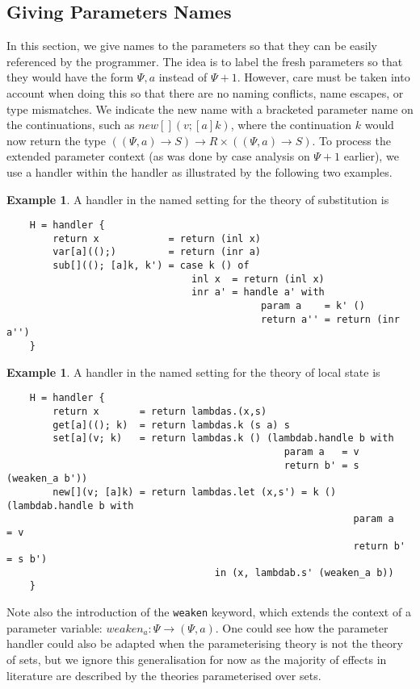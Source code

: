 \documentclass{scrartcl}
\theoremstyle{definition}
\newtheorem{example}[theorem]{Example}
\newcommand{\PCtx}{\Psi}
\begin{document}
\subsection{Giving Parameters Names}

In this section, we give names to the parameters so that they can be easily referenced by the programmer. The idea is to label the fresh parameters so that they would have the form $\PCtx,a$ instead of $\PCtx+1$. However, care must be taken into account when doing this so that there are no naming conflicts, name escapes, or type mismatches. We indicate the new name with a bracketed parameter name on the continuations, such as $new[](v; [a]k)$, where the continuation $k$ would now return the type $((\PCtx,a)\to S)\to R\times ((\PCtx,a)\to S)$. To process the extended parameter context (as was done by case analysis on $\PCtx+1$ earlier), we use a handler within the handler as illustrated by the following two examples.

\begin{example}
A handler in the named setting for the theory of substitution is
\begin{lstlisting}
    H = handler {
        return x            = return (inl x)
        var[a](();)         = return (inr a)
        sub[]((); [a]k, k') = case k () of
                                inl x  = return (inl x)
                                inr a' = handle a' with
                                            param a    = k' ()
                                            return a'' = return (inr a'')
    }
\end{lstlisting}
\end{example}

\begin{example}
A handler in the named setting for the theory of local state is
\begin{lstlisting}
    H = handler {
        return x       = return lambdas.(x,s)
        get[a]((); k)  = return lambdas.k (s a) s
        set[a](v; k)   = return lambdas.k () (lambdab.handle b with
                                                param a   = v
                                                return b' = s (weaken_a b'))
        new[](v; [a]k) = return lambdas.let (x,s') = k () (lambdab.handle b with
                                                            param a   = v
                                                            return b' = s b')
                                    in (x, lambdab.s' (weaken_a b))
    }
\end{lstlisting}
\end{example}
Note also the introduction of the \lstinline{weaken} keyword, which extends the context of a parameter variable: $weaken_a:\PCtx \to (\PCtx, a)$. One could see how the parameter handler could also be adapted when the parameterising theory is not the theory of sets, but we ignore this generalisation for now as the majority of effects in literature are described by the theories parameterised over sets.
\end{document}
